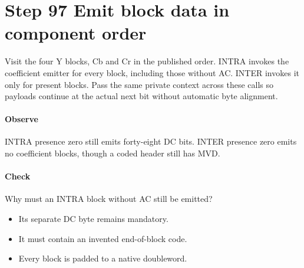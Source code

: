 \section{Step 97 Emit block data in component order}\label{h263-syntax-s07}
Visit the four Y blocks, Cb and Cr in the published order. INTRA invokes the
coefficient emitter for every block, including those without AC. INTER invokes
it only for present blocks. Pass the same private context across these calls so
payloads continue at the actual next bit without automatic byte alignment.

\paragraph{Observe} INTRA presence zero still emits forty-eight DC bits. INTER
presence zero emits no coefficient blocks, though a coded header still has MVD.
\paragraph{Check} Why must an INTRA block without AC still be emitted?
\begin{itemize}
  \item[A.] Its separate DC byte remains mandatory.
  \item[B.] It must contain an invented end-of-block code.
  \item[C.] Every block is padded to a native doubleword.
\end{itemize}
